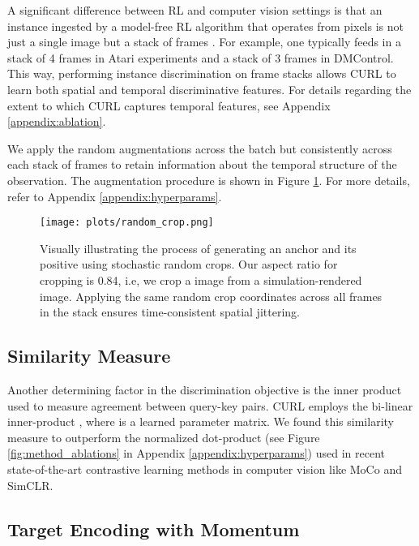 \documentclass{article}
\begin{document}
A significant difference between RL and computer vision settings is that an instance ingested by a model-free RL algorithm that operates from pixels is not just a single image but a stack of frames \cite{mnih2015human}. For example, one typically feeds in a stack of 4 frames in Atari experiments and a stack of 3 frames in DMControl. This way, performing instance discrimination on frame stacks allows CURL to learn both spatial and temporal discriminative features. For details regarding the extent to which CURL captures temporal features, see Appendix \ref{appendix:ablation}.

We apply the random augmentations across the batch but consistently across each stack of frames to retain information about the temporal structure of the observation. The augmentation procedure is shown in Figure \ref{fig:random_crop}. For more details, refer to Appendix \ref{appendix:hyperparams}.

\begin{figure}[ht]
\begin{center}
\centerline{\texttt{[image: plots/random\_crop.png]}}
\caption{Visually illustrating the process of generating an anchor and its positive using stochastic random crops. Our aspect ratio for cropping is 0.84, i.e, we crop a  image from a  simulation-rendered image. Applying the same random crop coordinates across all frames in the stack ensures time-consistent spatial jittering.}
\label{fig:random_crop}
\end{center}
\vskip -0.2in
\end{figure}
\vspace*{-4mm}
\subsection{Similarity Measure}

Another determining factor in the discrimination objective is the inner product used to measure agreement between query-key pairs. CURL employs the bi-linear inner-product , where  is a learned parameter matrix. We found this similarity measure to outperform the normalized dot-product (see Figure \ref{fig:method_ablations} in Appendix \ref{appendix:hyperparams}) used in recent state-of-the-art contrastive learning methods in computer vision like MoCo and SimCLR.

\vspace*{-2mm}
\subsection{Target Encoding with Momentum}
\end{document}
